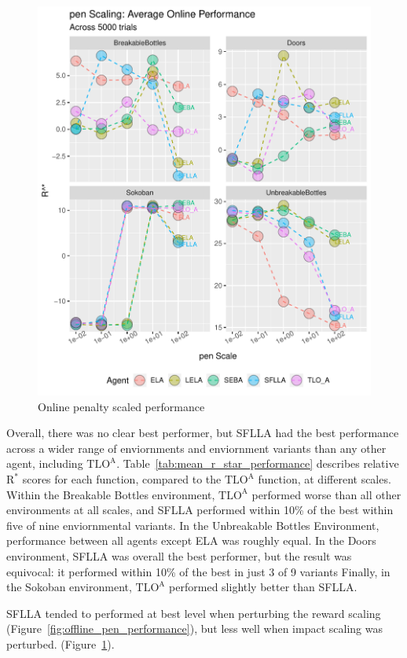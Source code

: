 \begin{figure}[h]
  \includegraphics[width=\columnwidth]{output/onlinepen.pdf}
  \caption{Online penalty scaled performance}
  \label{fig:offline_pen_performance2}
\end{figure}

Overall, there was no clear best performer, but SFLLA had the best performance across a wider range of enviornments and enviornment variants than any other agent, including  $\text{TLO}^\text{A}$. Table~\ref{tab:mean_r_star_performance} describes relative $\text{R}^*$ scores for each function, compared to the $\text{TLO}^\text{A}$ function, at different scales.  Within the Breakable Bottles environment, $\text{TLO}^\text{A}$ performed worse than all other environments at all scales, and SFLLA performed within 10\% of the best within five of nine enviornmental variants. In the Unbreakable Bottles Environment, performance between all agents except ELA was roughly equal. In the Doors environment, SFLLA was overall the best performer, but the result was equivocal: it performed within 10\% of the best in just 3 of 9 variants Finally, in the Sokoban environment, $\text{TLO}^\text{A}$ performed slightly better than SFLLA.

SFLLA tended to performed at best level when perturbing the reward scaling (Figure~\ref{fig:offline_pen_performance}), but less well when impact scaling was perturbed. (Figure~\ref{fig:offline_pen_performance2}).